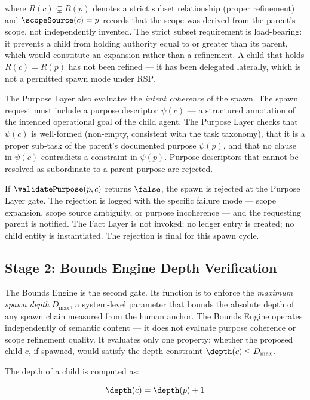 where $R(c) \subsetneq R(p)$ denotes a strict subset relationship (proper refinement) and $\scopeSource(c) = p$ records that the scope was derived from the parent's scope, not independently invented. The strict subset requirement is load-bearing: it prevents a child from holding authority equal to or greater than its parent, which would constitute an expansion rather than a refinement. A child that holds $R(c) = R(p)$ has not been refined — it has been delegated laterally, which is not a permitted spawn mode under RSP.

The Purpose Layer also evaluates the \emph{intent coherence} of the spawn. The spawn request must include a purpose descriptor $\psi(c)$ — a structured annotation of the intended operational goal of the child agent. The Purpose Layer checks that $\psi(c)$ is well-formed (non-empty, consistent with the task taxonomy), that it is a proper sub-task of the parent's documented purpose $\psi(p)$, and that no clause in $\psi(c)$ contradicts a constraint in $\psi(p)$. Purpose descriptors that cannot be resolved as subordinate to a parent purpose are rejected.

If $\validatePurpose(p, c)$ returns $\false$, the spawn is rejected at the Purpose Layer gate. The rejection is logged with the specific failure mode — scope expansion, scope source ambiguity, or purpose incoherence — and the requesting parent is notified. The Fact Layer is not invoked; no ledger entry is created; no child entity is instantiated. The rejection is final for this spawn cycle.

\subsection{Stage 2: Bounds Engine Depth Verification}
\label{sec:rs-protocol-bounds}

The Bounds Engine is the second gate. Its function is to enforce the \emph{maximum spawn depth} $D_{\max}$, a system-level parameter that bounds the absolute depth of any spawn chain measured from the human anchor. The Bounds Engine operates independently of semantic content — it does not evaluate purpose coherence or scope refinement quality. It evaluates only one property: whether the proposed child $c$, if spawned, would satisfy the depth constraint $\depth(c) \leq D_{\max}$.

The depth of a child is computed as:

\begin{equation}
\depth(c) = \depth(p) + 1
\label{eq:child-depth}
\end{equation}

